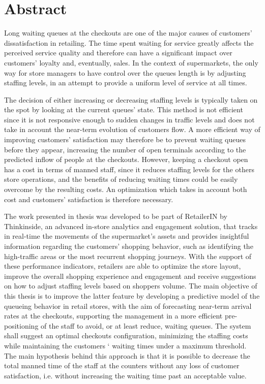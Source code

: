 \chapter*{Abstract}
\label{cha:abstract}


Long waiting queues at the checkouts are one of the major causes of customers’ dissatisfaction in retailing. The time spent waiting for service greatly affects the perceived service quality and therefore can have a significant impact over customers’ loyalty and, eventually, sales. In the context of supermarkets, the only way for store managers to have control over the queues length is by adjusting staffing levels, in an attempt to provide a uniform level of service at all times.

The decision of either increasing or decreasing staffing levels is typically taken on the spot by looking at the current queues’ state. This method is not efficient since it is not responsive enough to sudden changes in traffic levels  and does not take in account the near-term evolution of customers flow. A more efficient way of improving customers’ satisfaction may therefore be to prevent waiting queues before they appear, increasing the number of open terminals according to the predicted inflow of people at the checkouts. However, keeping a checkout open has a cost in terms of manned staff, since it reduces staffing levels for the others store operations, and the benefits of reducing waiting times could be easily overcome by the resulting costs. An optimization which takes in account both cost and customers’ satisfaction is therefore necessary.

The work presented in thesis was developed to be part of RetailerIN by Thinkinside, an advanced in-store analytics and engagement solution, that tracks in real-time the movements of the supermarket’s assets and provides insightful information regarding the customers’ shopping behavior, such as identifying the high-traffic areas or the most recurrent shopping journeys. With the support of these performance indicators, retailers are able to optimize the store layout, improve the overall shopping experience and engagement and receive suggestions on how to adjust staffing levels based on shoppers volume. The main objective of this thesis is to improve the latter feature by developing a predictive model of the queueing behavior in retail stores, with the aim of forecasting near-term arrival rates at the checkouts, supporting the management in a more efficient pre-positioning of the staff to avoid, or at least reduce, waiting queues. The system shall suggest an optimal checkouts configuration, minimizing the staffing costs while maintaining the customers ‘ waiting times under a maximum threshold. The main hypothesis behind this approach is that it is possible to decrease the total manned time of the staff at the counters without any loss of customer satisfaction, i.e. without increasing the waiting time past an acceptable value.

